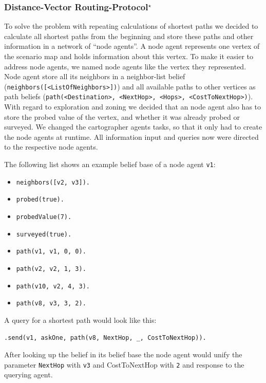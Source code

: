 \subsubsection[Distance-Vector Routing Protocol]{Distance-Vector Routing-Protocol$^\star$}\label{alg:map_dv}
To solve the problem with repeating calculations of shortest paths we decided to calculate all shortest paths from the beginning and store these paths and other information in a network of ``node agents''. A node agent represents one vertex of the scenario map and holds information about this vertex. To make it easier to address node agents, we named node agents like the vertex they represented. Node agent store all its neighbors in a neighbor-list belief (\texttt{neighbors([<ListOfNeighbors>])}) and all available paths to other vertices as path beliefs (\texttt{path(<Destination>, <NextHop>, <Hops>, <CostToNextHop>)}). With regard to exploration and zoning we decided that an node agent also has to store the probed value of the vertex, and whether it was already probed or surveyed. We changed the cartographer agents tasks, so that it only had to create the node agents at runtime. All information input and queries now were directed to the respective node agents.

\begin{samepage}
The following list shows an example belief base of a node agent \texttt{v1}:
\begin{itemize}
  \item \texttt{neighbors([v2, v3]).}
  \item \texttt{probed(true).}
  \item \texttt{probedValue(7).}
  \item \texttt{surveyed(true).}
  \item \texttt{path(v1, v1, 0, 0).}
  \item \texttt{path(v2, v2, 1, 3).}
  \item \texttt{path(v10, v2, 4, 3).}
  \item \texttt{path(v8, v3, 3, 2).}
\end{itemize}
\end{samepage}

A query for a shortest path would look like this:
\begin{lstlisting}[caption={Query for shortest path from \texttt{v1} to \texttt{v8}}, label={lst:dv_shortestPath_query}]
  .send(v1, askOne, path(v8, NextHop, _, CostToNextHop)).
\end{lstlisting}
After looking up the belief in its belief base the node agent would unify the parameter \texttt{NextHop} with \texttt{v3} and CostToNextHop with \texttt{2} and response to the querying agent.

